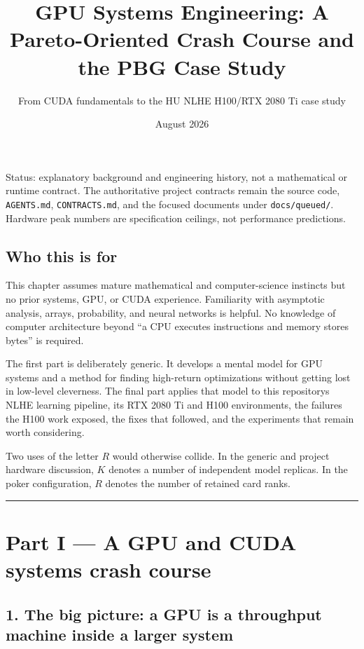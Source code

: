 \documentclass[
  10pt,
  letterpaper,
]{article}
\title{GPU Systems Engineering: A Pareto-Oriented Crash Course and the
PBG Case Study}
\subtitle{From CUDA fundamentals to the HU NLHE H100/RTX 2080 Ti case
study}
\author{}
\date{August 2026}
\begin{document}
\maketitle

{
\setcounter{tocdepth}{2}
\tableofcontents
}
Status: explanatory background and engineering history, not a
mathematical or runtime contract. The authoritative project contracts
remain the source code, \texttt{AGENTS.md}, \texttt{CONTRACTS.md}, and
the focused documents under \texttt{docs/queued/}. Hardware peak numbers
are specification ceilings, not performance predictions.

\subsection{Who this is for}\label{who-this-is-for}

This chapter assumes mature mathematical and computer-science instincts
but no prior systems, GPU, or CUDA experience. Familiarity with
asymptotic analysis, arrays, probability, and neural networks is
helpful. No knowledge of computer architecture beyond ``a CPU executes
instructions and memory stores bytes'' is required.

The first part is deliberately generic. It develops a mental model for
GPU systems and a method for finding high-return optimizations without
getting lost in low-level cleverness. The final part applies that model
to this repository\textquotesingle s NLHE learning pipeline, its RTX
2080 Ti and H100 environments, the failures the H100 work exposed, the
fixes that followed, and the experiments that remain worth considering.

Two uses of the letter \(R\) would otherwise collide. In the generic and
project hardware discussion, \(K\) denotes a number of independent model
replicas. In the poker configuration, \(R\) denotes the number of
retained card ranks.

\begin{center}\rule{0.5\linewidth}{0.5pt}\end{center}

\section{Part I --- A GPU and CUDA systems crash
course}\label{part-i--a-gpu-and-cuda-systems-crash-course}

\subsection{1. The big picture: a GPU is a throughput machine inside a
larger
system}\label{1-the-big-picture-a-gpu-is-a-throughput-machine-inside-a-larger-system}
\end{document}
